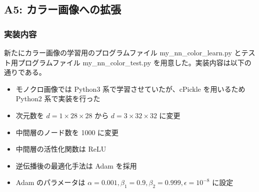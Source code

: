 \documentclass[a4paper,dvipdfmx]{jsarticle}
\begin{document}
\subsection*{A5: カラー画像への拡張}

\subsubsection*{実装内容}

新たにカラー画像の学習用のプログラムファイル my\_nn\_color\_learn.py とテスト用プログラムファイル my\_nn\_color\_test.py を用意した。実装内容は以下の通りである。

\begin{itemize}
	\item モノクロ画像では Python3 系で学習させていたが、cPickle を用いるため Python2 系で実装を行った
	\item 次元数を $ d=1 \times 28 \times 28 $ から $ d=3 \times 32 \times 32 $ に変更
	\item 中間層のノード数を 1000 に変更
	\item 中間層の活性化関数は ReLU
	\item 逆伝播後の最適化手法は Adam を採用
	\item Adam のパラメータは $\alpha = 0.001, \beta_1 = 0.9, \beta_2 =  0.999, \epsilon = 10^{-8}$ に設定
\end{itemize}
\end{document}
